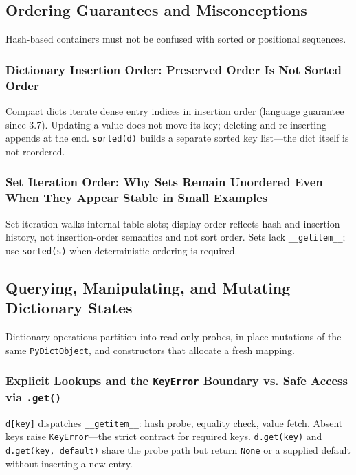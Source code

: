 \documentclass[a4paper,twoside]{report}
\begin{document}
\subsection{Ordering Guarantees and Misconceptions}

Hash-based containers must not be confused with sorted or positional sequences.

\subsubsection{Dictionary Insertion Order: Preserved Order Is Not Sorted Order}

Compact dicts iterate dense entry indices in insertion order (language guarantee since 3.7). Updating a value does not move its key; deleting and re-inserting appends at the end. \texttt{sorted(d)} builds a separate sorted key list---the dict itself is not reordered.

\subsubsection{Set Iteration Order: Why Sets Remain Unordered Even When They Appear Stable in Small Examples}

Set iteration walks internal table slots; display order reflects hash and insertion history, not insertion-order semantics and not sort order. Sets lack \texttt{\_\_getitem\_\_}; use \texttt{sorted(s)} when deterministic ordering is required.


\subsection{Querying, Manipulating, and Mutating Dictionary States}

Dictionary operations partition into read-only probes, in-place mutations of the same \texttt{PyDictObject}, and constructors that allocate a fresh mapping.

\subsubsection{Explicit Lookups and the \texttt{KeyError} Boundary vs. Safe Access via \texttt{.get()}}

\texttt{d[key]} dispatches \texttt{\_\_getitem\_\_}: hash probe, equality check, value fetch. Absent keys raise \texttt{KeyError}---the strict contract for required keys. \texttt{d.get(key)} and \texttt{d.get(key, default)} share the probe path but return \texttt{None} or a supplied default without inserting a new entry.
\end{document}
